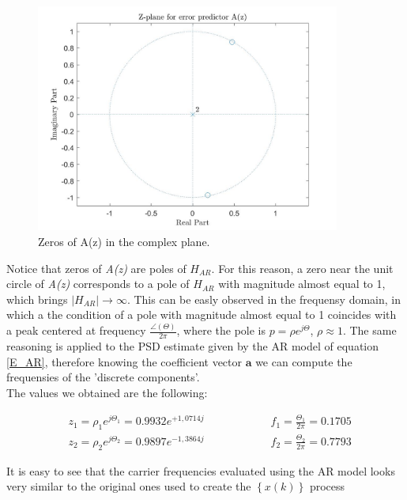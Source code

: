 \documentclass[a4paper,11pt,openright,twoside]{report}
\begin{document}
\begin{figure}[h!]
	\centering
	\includegraphics[width=10cm]{images/zplane_Az.jpg}
	\caption{Zeros of A(z) in the complex plane.}\label{Az}
\end{figure}	

\clearpage
Notice that zeros of \textit{A(z)} are poles of $H_{AR}$. For this reason, a zero near the unit circle of \textit{A(z)} corresponds to a pole of $H_{AR}$ with magnitude almost equal to 1, which brings $|H_{AR}|\rightarrow \infty$. This can be easly observed in the frequensy domain, in which a the condition of a pole with magnitude almost equal to 1 coincides with a peak centered at frequency $\frac{\angle(\Theta)}{2\pi}$, where the pole is $p=\rho e^{j\Theta}$, $\rho \approx 1$. The same reasoning is applied to the PSD estimate given by the AR model of equation \ref{E_AR}, therefore knowing the coefficient vector $\mathbf{a}$ we can compute the frequensies of the 'discrete components'. \\
The values we obtained are the following:

\begin{equation*}
\begin{split}
& z_1 = \rho_1 e^{j\Theta_1} = 0.9932e^{+1,0714j} \quad \quad \quad \quad \quad \quad  f_1= \frac{\Theta_1}{2\pi} = 0.1705\\
& z_2 = \rho_2 e^{j\Theta_2} = 0.9897e^{-1,3864j} \quad \quad \quad \quad \quad \quad  f_2= \frac{\Theta_2}{2\pi} = 0.7793
\end{split}
\end{equation*}

It is easy to see that the carrier frequencies evaluated using the AR model looks very similar to the original ones used to create the $\left \lbrace x\left(k\right) \right \rbrace$ process 
\end{document}
